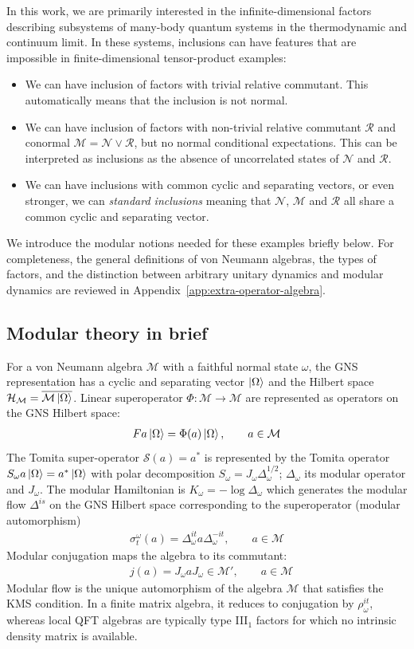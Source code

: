 \documentclass[a4paper,11pt]{article}
\theoremstyle{definition}
\newcommand{\mR}{\mathcal{R}}
\newcommand{\mN}{\mathcal{N}}
\newcommand{\mH}{\mathcal{H}}
\newcommand{\mM}{\mathcal{M}}
\begin{document}
In this work, we are primarily interested in the infinite-dimensional factors describing
subsystems of many-body quantum systems in the thermodynamic and continuum limit.
In these systems, inclusions can have features that are impossible in
finite-dimensional tensor-product examples: 
\begin{itemize}
\item We can have inclusion of factors with trivial relative commutant. This automatically means that the inclusion is not normal.

\item We can have inclusion of factors with non-trivial relative commutant $\mR$ and conormal $\mM=\mN\vee \mR$, but no normal conditional expectations. This can be interpreted as inclusions as the absence of uncorrelated states of $\mN$ and $\mR$.

\item We can have inclusions with common cyclic and separating vectors, or even stronger, we can {\it standard inclusions} meaning that $\mN$, $\mM$ and $\mR$ all share a common cyclic and separating vector.
\end{itemize}
We introduce the modular notions needed for these examples briefly below.
For completeness, the general definitions of von Neumann algebras, the
types of factors, and the distinction between arbitrary unitary dynamics
and modular dynamics are reviewed in Appendix~\ref{app:extra-operator-algebra}.

\subsection{Modular theory in brief}
For a von Neumann algebra $\mM$ with a faithful normal state $\omega$, the GNS representation has a cyclic and separating vector $\ket{\Omega}$ and the Hilbert space $\mH_\mM=\overline{\mM\ket{\Omega}}$. Linear superoperator $\Phi:\mM\to \mM$ are represented as operators on the GNS Hilbert space:
\begin{align}
    F a\ket{\Omega}=\Phi(a)\ket{\Omega},\qquad a\in\mM
\end{align}
The Tomita super-operator $\mathcal{S}(a)=a^*$ is represented by the Tomita operator $S_\omega a\ket{\Omega}=a^*\ket{\Omega}$ with polar decomposition $S_\omega=J_\omega\Delta_\omega^
{1/2}$; $\Delta_\omega$ its modular operator and $J_\omega$. The modular Hamiltonian is $K_\omega=-\log\Delta_\omega$ which generates the modular flow $\Delta^{is}$ on the GNS Hilbert space corresponding to the superoperator (modular automorphism)
\begin{align}
\sigma_t^\omega(a)=\Delta_\omega^{it}a\Delta_\omega^{-it},\qquad a\in\mM
\end{align}
Modular conjugation maps the algebra to its commutant:
\begin{align}
&j(a)=J_\omega a J_\omega\in \mM',\qquad a\in\mM
\end{align}
 Modular flow is the unique automorphism of the algebra $\mM$ that satisfies the KMS condition. In a finite matrix algebra, it reduces to conjugation by $\rho_\omega^{it}$, whereas local QFT algebras are typically type III$_1$ factors for which no intrinsic density matrix is available.
\end{document}
